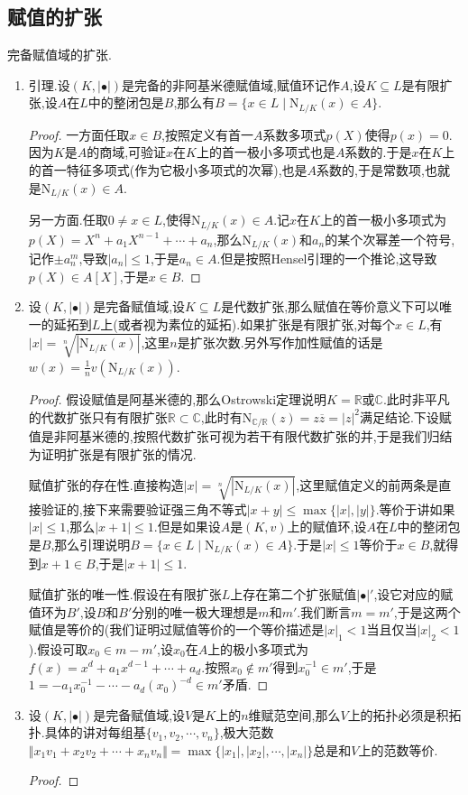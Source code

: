 \subsection{赋值的扩张}

完备赋值域的扩张.
\begin{enumerate}
	\item 引理.设$(K,|\bullet|)$是完备的非阿基米德赋值域,赋值环记作$A$,设$K\subseteq L$是有限扩张,设$A$在$L$中的整闭包是$B$,那么有$B=\{x\in L\mid\mathrm{N}_{L/K}(x)\in A\}$.
	\begin{proof}
		
		一方面任取$x\in B$,按照定义有首一$A$系数多项式$p(X)$使得$p(x)=0$.因为$K$是$A$的商域,可验证$x$在$K$上的首一极小多项式也是$A$系数的.于是$x$在$K$上的首一特征多项式(作为它极小多项式的次幂),也是$A$系数的,于是常数项,也就是$\mathrm{N}_{L/K}(x)\in A$.
		
		\qquad
		
		另一方面.任取$0\not=x\in L$,使得$\mathrm{N}_{L/K}(x)\in A$.记$x$在$K$上的首一极小多项式为$p(X)=X^n+a_1X^{n-1}+\cdots+a_n$,那么$\mathrm{N}_{L/K}(x)$和$a_n$的某个次幂差一个符号,记作$\pm a_n^m$,导致$|a_n|\le1$,于是$a_n\in A$.但是按照Hensel引理的一个推论,这导致$p(X)\in A[X]$,于是$x\in B$.
	\end{proof}
	\item 设$(K,|\bullet|)$是完备赋值域,设$K\subseteq L$是代数扩张,那么赋值在等价意义下可以唯一的延拓到$L$上(或者视为素位的延拓).如果扩张是有限扩张,对每个$x\in L$,有$|x|=\sqrt[n]{|\mathrm{N}_{L/K}(x)|}$,这里$n$是扩张次数.另外写作加性赋值的话是$w(x)=\frac{1}{n}v(\mathrm{N}_{L/K}(x))$.
	\begin{proof}
		
		假设赋值是阿基米德的,那么Ostrowski定理说明$K=\mathbb{R}$或$\mathbb{C}$.此时非平凡的代数扩张只有有限扩张$\mathbb{R}\subset\mathbb{C}$,此时有$\mathrm{N}_{\mathbb{C}/\mathbb{R}}(z)=z\overline{z}=|z|^2$满足结论.下设赋值是非阿基米德的,按照代数扩张可视为若干有限代数扩张的并,于是我们归结为证明扩张是有限扩张的情况.
		
		赋值扩张的存在性.直接构造$|x|=\sqrt[n]{|\mathrm{N}_{L/K}(x)|}$,这里赋值定义的前两条是直接验证的,接下来需要验证强三角不等式$|x+y|\le\max\{|x|,|y|\}$.等价于讲如果$|x|\le1$,那么$|x+1|\le1$.但是如果设$A$是$(K,v)$上的赋值环,设$A$在$L$中的整闭包是$B$,那么引理说明$B=\{x\in L\mid\mathrm{N}_{L/K}(x)\in A\}$.于是$|x|\le1$等价于$x\in B$,就得到$x+1\in B$,于是$|x+1|\le1$.
		
		赋值扩张的唯一性.假设在有限扩张$L$上存在第二个扩张赋值$|\bullet|'$,设它对应的赋值环为$B'$,设$B$和$B'$分别的唯一极大理想是$m$和$m'$.我们断言$m=m'$,于是这两个赋值是等价的(我们证明过赋值等价的一个等价描述是$|x|_1<1$当且仅当$|x|_2<1$).假设可取$x_0\in m-m'$,设$x_0$在$A$上的极小多项式为$f(x)=x^d+a_1x^{d-1}+\cdots+a_d$.按照$x_0\not\in m'$得到$x_0^{-1}\in m'$,于是$1=-a_1x_0^{-1}-\cdots-a_d(x_0)^{-d}\in m'$矛盾.
	\end{proof}
    \item 设$(K,|\bullet|)$是完备赋值域,设$V$是$K$上的$n$维赋范空间,那么$V$上的拓扑必须是积拓扑.具体的讲对每组基$\{v_1,v_2,\cdots,v_n\}$,极大范数$\Vert x_1v_1+x_2v_2+\cdots+x_nv_n\Vert=\max\{|x_1|,|x_2|,\cdots,|x_n|\}$总是和$V$上的范数等价.
    \begin{proof}
    	

\end{proof}
\end{enumerate}
